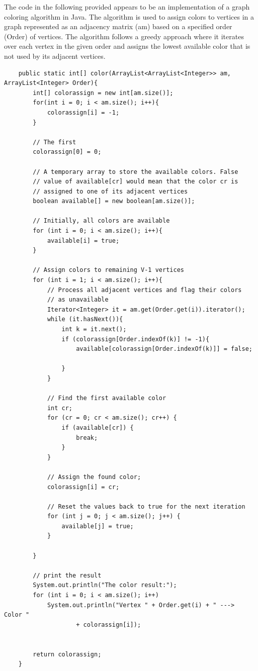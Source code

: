 \documentclass{article}
\begin{document}
The code in the following provided appears to be an implementation of a graph coloring algorithm in Java. The algorithm is used to assign colors to vertices in a graph represented as an adjacency matrix (am) based on a specified order (Order) of vertices. The algorithm follows a greedy approach where it iterates over each vertex in the given order and assigns the lowest available color that is not used by its adjacent vertices.\cite{color}

    \begin{verbatim}
    public static int[] color(ArrayList<ArrayList<Integer>> am, ArrayList<Integer> Order){
        int[] colorassign = new int[am.size()];
        for(int i = 0; i < am.size(); i++){
            colorassign[i] = -1;
        }

        // The first
        colorassign[0] = 0;

        // A temporary array to store the available colors. False
        // value of available[cr] would mean that the color cr is
        // assigned to one of its adjacent vertices
        boolean available[] = new boolean[am.size()];

        // Initially, all colors are available
        for (int i = 0; i < am.size(); i++){
            available[i] = true;
        }

        // Assign colors to remaining V-1 vertices
        for (int i = 1; i < am.size(); i++){
            // Process all adjacent vertices and flag their colors
            // as unavailable
            Iterator<Integer> it = am.get(Order.get(i)).iterator();
            while (it.hasNext()){
                int k = it.next();
                if (colorassign[Order.indexOf(k)] != -1){
                    available[colorassign[Order.indexOf(k)]] = false;

                }
            }

            // Find the first available color
            int cr;
            for (cr = 0; cr < am.size(); cr++) {
                if (available[cr]) {
                    break;
                }
            }

            // Assign the found color;
            colorassign[i] = cr;

            // Reset the values back to true for the next iteration
            for (int j = 0; j < am.size(); j++) {
                available[j] = true;
            }

        }

        // print the result
        System.out.println("The color result:");
        for (int i = 0; i < am.size(); i++)
            System.out.println("Vertex " + Order.get(i) + " --->  Color "
                    + colorassign[i]);


        return colorassign;
    }
    \end{verbatim}
\end{document}
